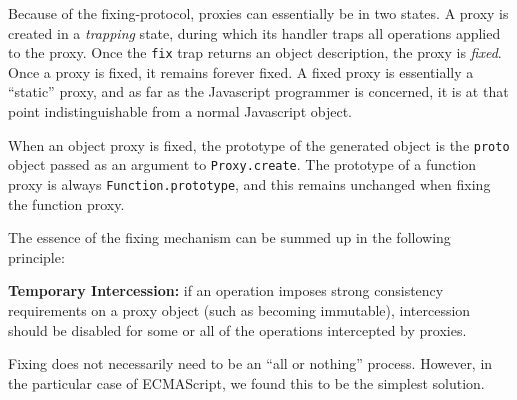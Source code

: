 \documentclass{sig-alternate}
\begin{document}
Because of the fixing-protocol, proxies can essentially be in two states. A proxy is created in a \emph{trapping} state, during which its handler traps all operations applied to the proxy. Once the \texttt{fix} trap returns an object description, the proxy is \emph{fixed}. Once a proxy is fixed, it remains forever fixed. A fixed proxy is essentially a ``static'' proxy, and as far as the Javascript programmer is concerned, it is at that point indistinguishable from a normal Javascript object.

When an object proxy is fixed, the prototype of the generated object is the \texttt{proto} object passed as an argument to \texttt{Proxy.create}. The prototype of a function proxy is always \texttt{Function.prototype}, and this remains unchanged when fixing the function proxy.

The essence of the fixing mechanism can be summed up in the following principle:

\textbf{Temporary Intercession:} if an operation imposes strong consistency requirements on a proxy object (such as becoming immutable), intercession should be disabled for some or all of the operations intercepted by proxies.

Fixing does not necessarily need to be an ``all or nothing'' process. However, in the particular case of ECMAScript, we found this to be the simplest solution.


%
%
%
\end{document}
